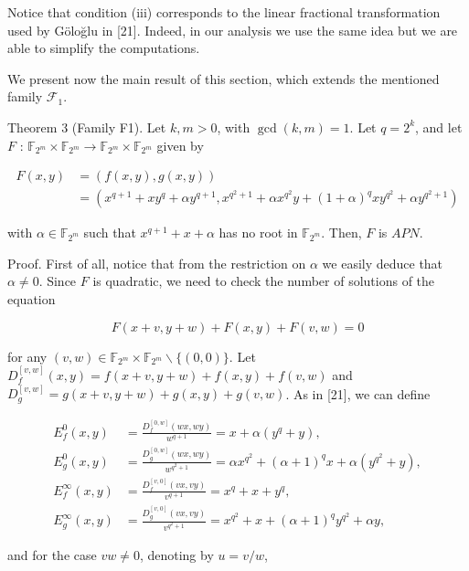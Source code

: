 \documentclass[10pt]{article}
\begin{document}
Notice that condition (iii) corresponds to the linear fractional transformation used by Göloğlu in [21]. Indeed, in our analysis we use the same idea but we are able to simplify the computations.

We present now the main result of this section, which extends the mentioned family $\mathcal{F}_{1}$.

Theorem 3 (Family F1). Let $k, m>0$, with $\operatorname{gcd}(k, m)=1$. Let $q=2^{k}$, and let $F$ : $\mathbb{F}_{2^{m}} \times \mathbb{F}_{2^{m}} \rightarrow \mathbb{F}_{2^{m}} \times \mathbb{F}_{2^{m}}$ given by

$$
\begin{aligned}
F(x, y) & =(f(x, y), g(x, y)) \\
& =\left(x^{q+1}+x y^{q}+\alpha y^{q+1}, x^{q^{2}+1}+\alpha x^{q^{2}} y+(1+\alpha)^{q} x y^{q^{2}}+\alpha y^{q^{2}+1}\right)
\end{aligned}
$$

with $\alpha \in \mathbb{F}_{2^{m}}$ such that $x^{q+1}+x+\alpha$ has no root in $\mathbb{F}_{2^{m}}$. Then, $F$ is $A P N$.

Proof. First of all, notice that from the restriction on $\alpha$ we easily deduce that $\alpha \neq 0$. Since $F$ is quadratic, we need to check the number of solutions of the equation


\begin{equation*}
F(x+v, y+w)+F(x, y)+F(v, w)=0 \tag{1}
\end{equation*}


for any $(v, w) \in \mathbb{F}_{2^{m}} \times \mathbb{F}_{2^{m}} \backslash\{(0,0)\}$. Let $D_{f}^{[v, w]}(x, y)=f(x+v, y+w)+f(x, y)+f(v, w)$ and $D_{g}^{[v, w]}=g(x+v, y+w)+g(x, y)+g(v, w)$. As in [21], we can define

$$
\begin{aligned}
E_{f}^{0}(x, y) & =\frac{D_{f}^{[0, w]}(w x, w y)}{w^{q+1}}=x+\alpha\left(y^{q}+y\right), \\
E_{g}^{0}(x, y) & =\frac{D_{g}^{[0, w]}(w x, w y)}{w^{q^{2}+1}}=\alpha x^{q^{2}}+(\alpha+1)^{q} x+\alpha\left(y^{q^{2}}+y\right), \\
E_{f}^{\infty}(x, y) & =\frac{D_{f}^{[v, 0]}(v x, v y)}{v^{q+1}}=x^{q}+x+y^{q}, \\
E_{g}^{\infty}(x, y) & =\frac{D_{g}^{[v, 0]}(v x, v y)}{v^{q^{2}+1}}=x^{q^{2}}+x+(\alpha+1)^{q} y^{q^{2}}+\alpha y,
\end{aligned}
$$

and for the case $v w \neq 0$, denoting by $u=v / w$,
\end{document}
